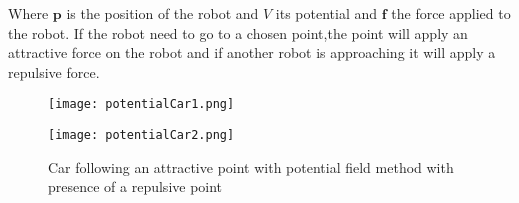 Where $\mathbf{p}$ is the position of the robot and $V$ its potential and $\mathbf{f}$ the force applied to the robot. If the robot need to go to a chosen point,the point will apply an attractive force on the robot and if another robot is approaching it will apply a repulsive force.

\begin{figure}[H]
\centering
    \begin{minipage}[b]{0.4\textwidth}
    \texttt{[image: potentialCar1.png]}
    \end{minipage}
    \begin{minipage}[b]{0.4\textwidth}
    \texttt{[image: potentialCar2.png]}
    \end{minipage}
    \caption{Car following an attractive point with potential field method with presence of a repulsive point}
    \label{fig:attractrep}
\end{figure}